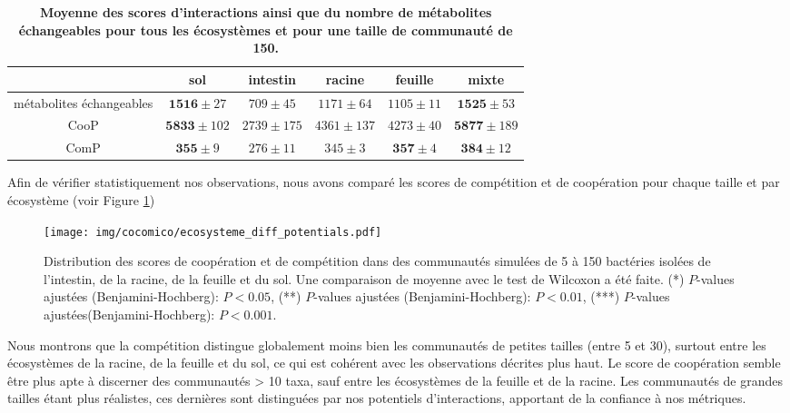 \documentclass[../main.tex]{subfiles}
\begin{document}
\begin{table}[H]
\centering
\begin{adjustbox}{width=1\textwidth}
\begin{tabular}{|c|c|c|c|c|c|}
\hline
 & sol & intestin & racine & feuille & mixte \\
\hline
métabolites échangeables & $\textbf{1516}\pm 27$ & $\textit{709}\pm 45$ & $1171\pm 64$ &$1105\pm 11$ & $\textbf{1525}\pm 53$ \\
CooP & $\textbf{5833}\pm 102$ & $\textit{2739} \pm 175$ & $4361 \pm 137$ & $4273 \pm 40$ & $\textbf{5877}\pm 189$ \\
ComP & $\textbf{355}\pm 9$ & $\textit{276} \pm 11$ & $345 \pm 3$ & $\textbf{357} \pm 4$ & $\textbf{384}\pm 12$\\

 \hline
\end{tabular}
\end{adjustbox}
\caption{\textbf{Moyenne des scores d'interactions ainsi que du nombre de métabolites échangeables pour tous les écosystèmes et pour une taille de communauté de 150.}}
\label{table:coop-comp-ecosys}
\end{table}

Afin de vérifier statistiquement nos observations, nous avons comparé les scores de compétition et de coopération pour chaque taille et par écosystème (voir Figure \ref{fig:diff-potentials})

\begin{figure}[H]
    \centering
    \texttt{[image: img/cocomico/ecosysteme\_diff\_potentials.pdf]}
    \caption{Distribution des scores de coopération et de compétition dans des communautés simulées de 5 à 150 bactéries isolées de l'intestin, de la racine, de la feuille et du sol. Une comparaison de moyenne avec le test de Wilcoxon a été faite. (*)  $P$-values ajustées (Benjamini-Hochberg): $P < 0.05$,
    (**) $P$-values ajustées (Benjamini-Hochberg): $P < 0.01$,
    (***) $P$-values ajustées(Benjamini-Hochberg): $P < 0.001$.}
    \label{fig:diff-potentials}
\end{figure}

Nous montrons que la compétition distingue globalement moins bien les communautés de petites tailles (entre 5 et 30), surtout entre les écosystèmes de la racine, de la feuille et du sol, ce qui est cohérent avec les observations décrites plus haut. Le score de coopération semble être plus apte à discerner des communautés > 10 taxa, sauf entre les écosystèmes de la feuille et de la racine. Les communautés de grandes tailles étant plus réalistes, ces dernières sont distinguées par nos potentiels d'interactions, apportant de la confiance à nos métriques. \\
\end{document}
